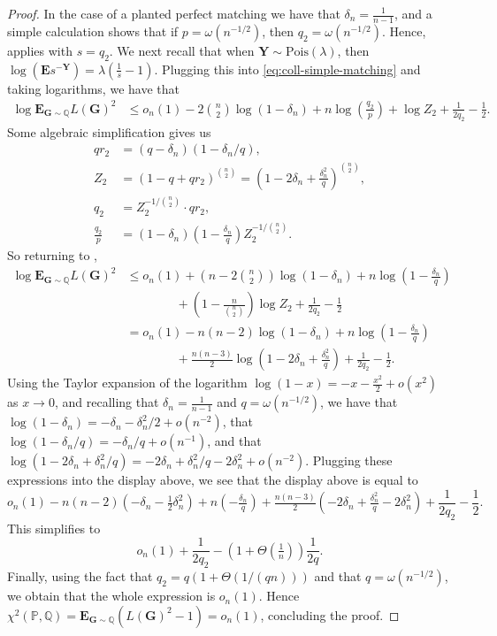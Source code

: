 \documentclass[10pt,a4paper]{amsart}
\newcommand{\deltanH}{\delta_{n}}
\newcommand{\bG}{\mathbf{G}}
\newcommand{\bY}{\mathbf{Y}}
\newcommand{\bbP}{\mathbb{P}}
\newcommand{\bbQ}{\mathbb{Q}}
\newcommand{\e}{{\mathbf E}}
\begin{document}
\begin{proof}
In the case of a planted perfect matching we have that $\deltanH = \frac{1}{n-1}$, 
and a simple calculation shows that 
if $p = \omega(n^{-1/2})$, 
then $q_2 = \omega(n^{-1/2})$.  
Hence,  applies with $s = q_{2}$.
We next recall that when $\bY \sim \mathrm{Pois}(\lambda)$, then $\log(\e{s^{-\bY}}) = \lambda\left(\frac{1}{s} - 1\right)$.
Plugging this into \cref{eq:coll-simple-matching} and taking logarithms, we have that 
\begin{align}
    \log \e_{\bG \sim \bbQ} L(\bG)^2
    &\le o_n(1) - 2\binom{n}{2}\log\left(1-\deltanH\right)  + n\log\left(\frac{q_2}{p}\right)+ \log Z_2 + \frac{1}{2q_2} - \frac{1}{2}. \label{eq:log}
    \end{align}
    Some algebraic simplification gives us
\begin{align}
    q r_2 &= (q-\deltanH)(1-\deltanH/q),\label{eq:simplif}\\
    Z_2 &= (1-q+qr_2)^{\binom{n}{2}} = \left(1-2\deltanH + \tfrac{\deltanH^2}{q}\right)^{\binom{n}{2}},\nonumber\\
    q_2 &= Z_2^{-1/\binom{n}{2}} \cdot q r_2, \nonumber\\
    \frac{q_2}{p} &= (1-\deltanH)\left(1-\tfrac{\deltanH}{q}\right) Z_2^{-1/\binom{n}{2}}.\nonumber
\end{align}
So returning to , 
\begin{align*}
\log \e_{\bG\sim\bbQ} L(\bG)^2
&\le o_n(1) + \left(n - 2\binom{n}{2}\right) \log \left(1-\deltanH\right) + n \log\left(1-\tfrac{\deltanH}{q}\right)  \\
&\qquad \qquad + \left(1-\tfrac{n}{\binom{n}{2}}\right)\log Z_2 + \frac{1}{2 q_2} - \frac{1}{2}\\
&= o_n(1) - n(n-2)\log (1-\deltanH) + n \log(1-\tfrac{\deltanH}{q})  \\
&\qquad \qquad + \tfrac{n(n-3)}{2} \log \left(1 - 2\deltanH + \tfrac{\deltanH^2}{q}\right) + \frac{1}{2q_2} - \frac{1}{2}.
\end{align*}
Using the Taylor expansion of the logarithm $\log(1-x) = -x - \frac{x^{2}}{2} + o(x^{2})$ as $x \to 0$, 
and recalling that $\deltanH = \frac{1}{n-1}$ and $q = \omega(n^{-1/2})$, 
we have that 
$\log(1 - \deltanH) = - \deltanH - \deltanH^{2} / 2 + o( n^{-2})$, 
that 
$\log(1 - \deltanH / q) = - \deltanH / q + o(n^{-1})$, 
and that 
$\log(1 - 2\deltanH + \deltanH^{2} / q) 
= - 2 \deltanH + \deltanH^{2} / q - 2 \deltanH^{2} + o(n^{-2})$. 
Plugging these expressions into the display above, we see that the display above is equal to 
\[
o_n(1) 
- n(n-2)(-\deltanH - \tfrac{1}{2}\deltanH^2)
+ n \left(-\tfrac{\deltanH}{q}\right)
+ \tfrac{n(n-3)}{2}\left( -2\deltanH + \tfrac{\deltanH^2}{q} - 2\deltanH^2\right)
 + \frac{1}{2q_{2}} - \frac{1}{2}.
\]
This simplifies to 
\[
o_{n}(1) + \frac{1}{2q_{2}} - \left(1 + \Theta \left( \tfrac{1}{n} \right) \right) \frac{1}{2q}.
\]
Finally, using the fact that $q_{2} = q \left( 1 + \Theta\left( 1/(qn) \right) \right)$ 
and that $q = \omega(n^{-1/2})$, 
we obtain that the whole expression is $o_{n}(1)$. 
Hence $\chi^2(\bbP, \bbQ) = \e_{\bG \sim \bbQ} ( L(\bG)^2 - 1 ) = o_n(1)$, concluding the proof.
\end{proof}
\end{document}
